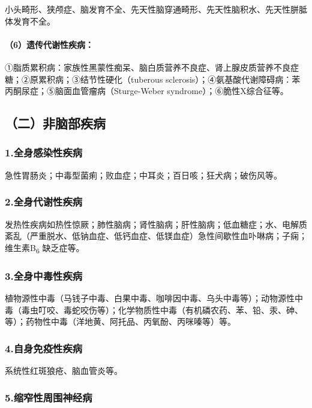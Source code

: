 小头畸形、狭颅症、脑发育不全、先天性脑穿通畸形、先天性脑积水、先天性胼胝体发育不全。

\paragraph{（6）遗传代谢性疾病：}

①脂质累积病：家族性黑蒙性痴呆、脑白质营养不良症、肾上腺皮质营养不良症糖；②原累积病；③结节性硬化（tuberous
sclerosis）；④氨基酸代谢障碍病：苯丙酮尿症；⑤脑面血管瘤病（Sturge-Weber
syndrome）；⑥脆性X综合征等。

\subsection{（二）非脑部疾病}

\subsubsection{1.全身感染性疾病}

急性胃肠炎；中毒型菌痢；败血症；中耳炎；百日咳；狂犬病；破伤风等。

\subsubsection{2.全身代谢性疾病}

发热性疾病如热性惊厥；肺性脑病；肾性脑病；肝性脑病；低血糖症；水、电解质紊乱（严重脱水、低钠血症、低钙血症、低镁血症）急性间歇性血卟啉病；子痫；维生素B\textsubscript{6}
缺乏症等。

\subsubsection{3.全身中毒性疾病}

植物源性中毒（马钱子中毒、白果中毒、咖啡因中毒、乌头中毒等）；动物源性中毒（毒虫叮咬、毒蛇咬伤等）；化学物质性中毒（有机磷农药、苯、铅、汞、砷、等）；药物性中毒（洋地黄、阿托品、丙氧酚、丙咪嗪等）等。

\subsubsection{4.自身免疫性疾病}

系统性红斑狼疮、脑血管炎等。

\subsubsection{5.缩窄性周围神经病}


